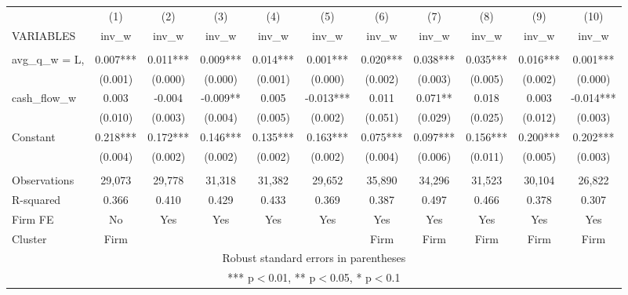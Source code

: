 \documentclass[]{article}
\begin{document}
\begin{tabular}{lcccccccccc} \hline
 & (1) & (2) & (3) & (4) & (5) & (6) & (7) & (8) & (9) & (10) \\
VARIABLES & inv\_w & inv\_w & inv\_w & inv\_w & inv\_w & inv\_w & inv\_w & inv\_w & inv\_w & inv\_w \\ \hline
 &  &  &  &  &  &  &  &  &  &  \\
avg\_q\_w = L, & 0.007*** & 0.011*** & 0.009*** & 0.014*** & 0.001*** & 0.020*** & 0.038*** & 0.035*** & 0.016*** & 0.001*** \\
 & (0.001) & (0.000) & (0.000) & (0.001) & (0.000) & (0.002) & (0.003) & (0.005) & (0.002) & (0.000) \\
cash\_flow\_w & 0.003 & -0.004 & -0.009** & 0.005 & -0.013*** & 0.011 & 0.071** & 0.018 & 0.003 & -0.014*** \\
 & (0.010) & (0.003) & (0.004) & (0.005) & (0.002) & (0.051) & (0.029) & (0.025) & (0.012) & (0.003) \\
Constant & 0.218*** & 0.172*** & 0.146*** & 0.135*** & 0.163*** & 0.075*** & 0.097*** & 0.156*** & 0.200*** & 0.202*** \\
 & (0.004) & (0.002) & (0.002) & (0.002) & (0.002) & (0.004) & (0.006) & (0.011) & (0.005) & (0.003) \\
 &  &  &  &  &  &  &  &  &  &  \\
Observations & 29,073 & 29,778 & 31,318 & 31,382 & 29,652 & 35,890 & 34,296 & 31,523 & 30,104 & 26,822 \\
R-squared & 0.366 & 0.410 & 0.429 & 0.433 & 0.369 & 0.387 & 0.497 & 0.466 & 0.378 & 0.307 \\
Firm FE & No & Yes & Yes & Yes & Yes & Yes & Yes & Yes & Yes & Yes \\
 Cluster & Firm &  &  &  &  & Firm & Firm & Firm & Firm & Firm \\ \hline
\multicolumn{11}{c}{ Robust standard errors in parentheses} \\
\multicolumn{11}{c}{ *** p$<$0.01, ** p$<$0.05, * p$<$0.1} \\
\end{tabular}
\end{document}
